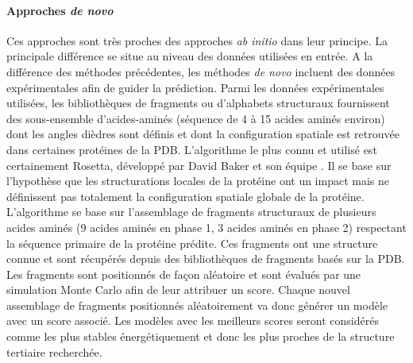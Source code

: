 \paragraph{Approches \textit{de novo}}

Ces approches sont très proches des approches \textit{ab initio} dans leur principe. La principale différence se situe au niveau des données utilisées en entrée. A la différence des méthodes précédentes, les méthodes \textit{de novo} incluent des données expérimentales afin de guider la prédiction. Parmi les données expérimentales utilisées, les bibliothèques de fragments ou d'alphabets structuraux fournissent des sous-ensemble d'acides-aminés (séquence de 4 à 15 acides aminés environ) dont les angles dièdres sont définis et dont la configuration spatiale est retrouvée dans certaines protéines de la PDB. L'algorithme le plus connu et utilisé est certainement Rosetta, développé par David Baker et son équipe \cite{rohl2004protein}. Il se base sur l'hypothèse que les structurations locales de la protéine ont un impact mais ne définissent pas totalement la configuration spatiale globale de la protéine. L'algorithme se base sur l'assemblage de fragments structuraux de plusieurs acides aminés (9 acides aminés en phase 1, 3 acides aminés en phase 2) respectant la séquence primaire de la protéine prédite. Ces fragments ont une structure connue et sont récupérés depuis des bibliothèques de fragments basés sur la PDB. Les fragments sont positionnés de façon aléatoire et sont évalués par une simulation Monte Carlo afin de leur attribuer un score. Chaque nouvel assemblage de fragments positionnés aléatoirement va donc générer un modèle avec un score associé. Les modèles avec les meilleurs scores seront considérés comme les plus stables énergétiquement et donc les plus proches de la structure tertiaire recherchée.

